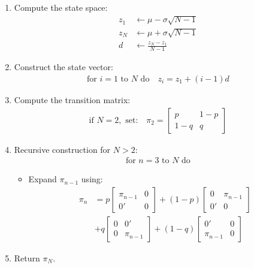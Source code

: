\documentclass{article}
\begin{document}
\begin{enumerate}
    \item Compute the state space:
    \begin{align*}
        z_1 &\leftarrow \mu - \sigma \sqrt{N-1} \\
        z_N &\leftarrow \mu + \sigma \sqrt{N-1} \\
        d &\leftarrow \frac{z_N - z_1}{N-1}
    \end{align*}
    
    \item Construct the state vector:
    \begin{align*}
        \text{for } i = 1 \text{ to } N \text{ do} \quad z_i = z_1 + (i - 1) d
    \end{align*}

    \item Compute the transition matrix:
    \begin{align*}
        \text{if } N = 2, \text{ set:} \quad
        \pi_2 = 
        \begin{bmatrix}
            p & 1 - p \\
            1 - q & q
        \end{bmatrix}
    \end{align*}

    \item Recursive construction for $N > 2$:
    \begin{align*}
        \text{for } n = 3 \text{ to } N \text{ do}
    \end{align*}
    \begin{itemize}
        \item Expand $\pi_{n-1}$ using:
        \begin{align*}
            \pi_n &= p
            \begin{bmatrix}
                \pi_{n-1} & 0 \\
                0' & 0
            \end{bmatrix}
            + (1 - p)
            \begin{bmatrix}
                0 & \pi_{n-1} \\
                0' & 0
            \end{bmatrix} \\
            &+ q
            \begin{bmatrix}
                0 & 0' \\
                0 & \pi_{n-1}
            \end{bmatrix}
            + (1 - q)
            \begin{bmatrix}
                0' & 0 \\
                \pi_{n-1} & 0
            \end{bmatrix}
        \end{align*}
    \end{itemize}
    
    \item Return $\pi_N$.
\end{enumerate}
\end{document}
